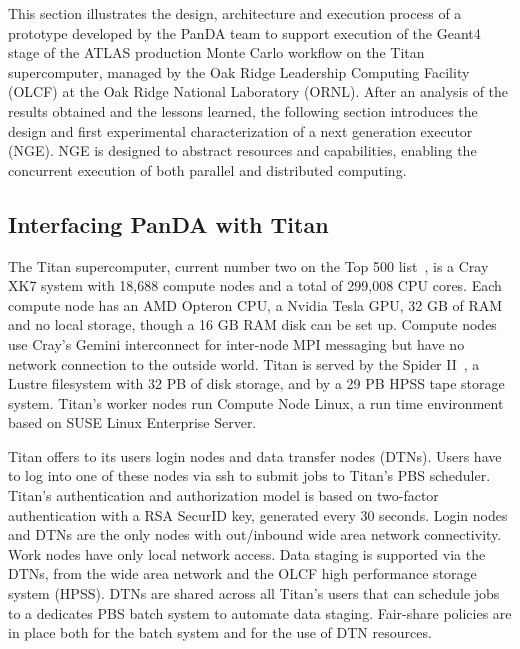 This section illustrates the design, architecture and execution process of a
prototype developed by the PanDA team to support execution of the Geant4 stage
of the ATLAS production Monte Carlo workflow on the Titan supercomputer, managed
by the Oak Ridge Leadership Computing Facility (OLCF) at the Oak Ridge National
Laboratory (ORNL). After an analysis of the results obtained and the lessons
learned, the following section introduces the design and first experimental
characterization of a next generation executor (NGE). NGE is designed to
abstract resources and capabilities, enabling the concurrent execution of both
parallel and distributed computing.


\subsection{Interfacing PanDA with Titan}
\label{ssec:panda_titan}

The Titan supercomputer, current number two
on the Top 500 list~\cite{top500}, is a Cray XK7 system with 18,688 compute
nodes and a total of 299,008 CPU cores. Each compute node has an AMD Opteron
CPU, a Nvidia Tesla GPU, 32 GB of RAM and no local storage, though a 16 GB RAM
disk can be set up. Compute nodes use Cray’s Gemini interconnect for inter-node
MPI messaging but have no network connection to the outside world. Titan is
served by the Spider II~\cite{spider2}, a Lustre filesystem with 32 PB of disk
storage, and by a 29 PB HPSS tape storage system. Titan’s worker nodes run
Compute Node Linux, a run time environment based on SUSE Linux Enterprise
Server.


Titan offers to its users login nodes and data transfer nodes (DTNs). Users have
to log into one of these nodes via ssh to submit jobs to Titan's PBS scheduler.
Titan's authentication and authorization model is based on two-factor
authentication with a RSA SecurID key, generated every 30 seconds. Login nodes
and DTNs are the only nodes with out/inbound wide area network connectivity.
Work nodes have only local network access. Data staging is supported via the
DTNs, from the wide area network and the OLCF high performance storage system
(HPSS). DTNs are shared across all Titan's users that can schedule jobs to a
dedicates PBS batch system to automate data staging. Fair-share policies are in
place both for the batch system and for the use of DTN resources.

